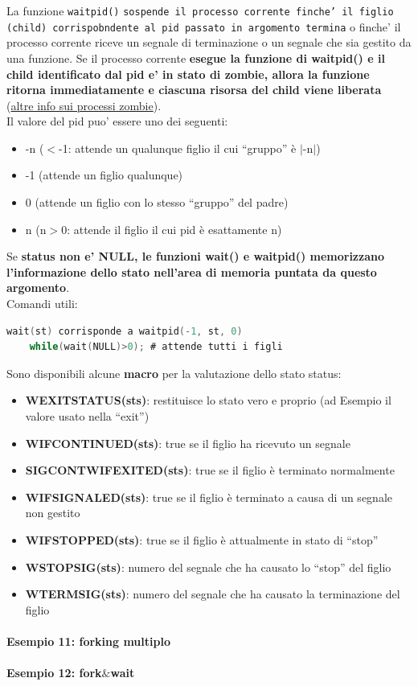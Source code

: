 La funzione \texttt{waitpid()} \texttt{sospende il processo corrente finche' il figlio (child) corrispobndente al pid passato in argomento termina} o finche' il processo corrente riceve un segnale di terminazione o un segnale che sia gestito da una funzione.
Se il processo corrente \textbf{esegue la funzione di waitpid() e il child identificato dal pid e' in stato di zombie, allora la funzione ritorna immediatamente e ciascuna risorsa del child viene liberata} (\href{https://stackoverflow.com/questions/20688982/zombie-process-vs-orphan-process}{altre info sui processi zombie}).\\

Il valore del pid puo' essere uno dei seguenti:
\begin{itemize}
    \item -n ($<$-1: attende un qualunque figlio il cui “gruppo” è $|$-n$|$) 
    \item -1 (attende un figlio qualunque)
    \item 0 (attende un figlio con lo stesso “gruppo” del padre)
    \item n (n$>$0: attende il figlio il cui pid è esattamente n)
\end{itemize}

Se \textbf{status non e' NULL, le funzioni wait() e waitpid() memorizzano l'informazione dello stato nell'area di memoria puntata da questo argomento}.\\

Comandi utili:
\begin{lstlisting}[language=C]
    wait(st) corrisponde a waitpid(-1, st, 0)
    while(wait(NULL)>0); # attende tutti i figli    
\end{lstlisting}

Sono disponibili alcune \textbf{macro} per la valutazione dello stato status: 
\begin{itemize}
    \item \textbf{WEXITSTATUS(sts)}: restituisce lo stato vero e proprio (ad Esempio il valore usato nella “exit”)
    \item \textbf{WIFCONTINUED(sts)}: true se il figlio ha ricevuto un segnale
    \item \textbf{SIGCONTWIFEXITED(sts)}: true se il figlio è terminato normalmente
    \item \textbf{WIFSIGNALED(sts)}: true se il figlio è terminato a causa di un segnale non gestito
    \item \textbf{WIFSTOPPED(sts)}: true se il figlio è attualmente in stato di “stop”
    \item \textbf{WSTOPSIG(sts)}: numero del segnale che ha causato lo “stop” del figlio
    \item \textbf{WTERMSIG(sts)}: numero del segnale che ha causato la terminazione del figlio
\end{itemize}

\paragraph{Esempio 11: forking multiplo}\hfill \break


\paragraph{Esempio 12: fork$\&$wait}\hfill \break


